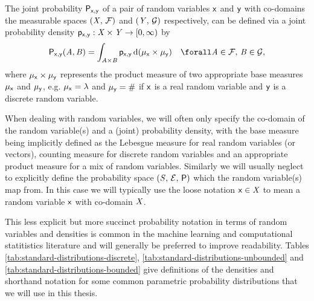 The joint probability $\mathsf{P}_{\mathsf{x},\mathsf{y}}$ of a pair of random variables $\mathsf{x}$ and $\mathsf{y}$ with co-domains the measurable spaces $(\mathit{X},\,\mathcal{F})$ and $(\mathit{Y},\,\mathcal{G})$ respectively, can be defined via a joint probability density $\mathsf{p}_{\mathsf{x},\mathsf{y}} : \mathit{X} \times \mathit{Y} \to [0,\infty)$ by
\begin{equation}\label{eq:real-rv-joint-prob-dens}
  \prob{\rvar{x},\rvar{y}}(\set{A},\set{B}) =
  \int_{\set{A}\times\set{B}} 
    \pden{\rvar{x},\rvar{y}} 
  \,\dr(\mu_{\rvar{x}} \times \mu_{\rvar{y}})
  \quad \forall \set{A} \in \sset{F}, \,\set{B} \in \sset{G},
\end{equation}
where $\mu_{\mathsf{x}} \times \mu_{\mathsf{y}}$ represents the product measure of two appropriate base measures $\mu_{\mathsf{x}}$ and $\mu_{\mathsf{y}}$, e.g. $\mu_{\rvar{x}} = \lebm{1}$ and $\mu_{\mathsf{y}} = \#$ if $\mathsf{x}$ is a real random variable and $\mathsf{y}$ is a discrete random variable.

When dealing with random variables, we will often only specify the co-domain of the random variable(s) and a (joint) probability density, with the base measure being implicitly defined as the Lebesgue measure for real random variables (or vectors), counting measure for discrete random variables and an appropriate product measure for a mix of random variables. Similarly we will usually neglect to explicitly define the probability space $(\mathit{S},\,\mathcal{E},\,\mathsf{P})$ which the random variable(s) map from. In this case we will typically use the loose notation $\mathsf{x} \in \mathit{X}$ to mean a random variable $\mathsf{x}$ with co-domain $\mathit{X}$. 

This less explicit but more succinct probability notation in terms of random variables and densities is common in the machine learning and computational statitistics literature and will generally be preferred to improve readability. 
Tables \ref{tab:standard-distributions-discrete}, \ref{tab:standard-distributions-unbounded} and \ref{tab:standard-distributions-bounded} give definitions of the densities and shorthand notation for some common parametric probability distributions that we will use in this thesis.

